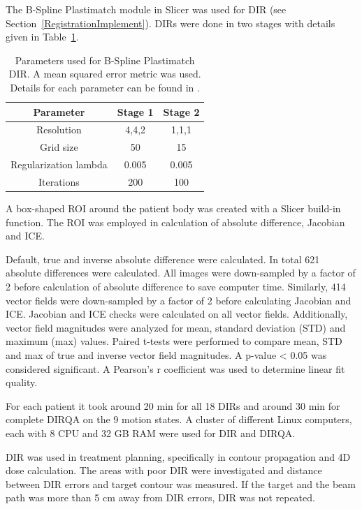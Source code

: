 The B-Spline Plastimatch module in Slicer was used for DIR (see Section~\ref{RegistrationImplement}). DIRs were done in two stages with details given in Table~\ref{tab:stages}. 

\begin{table}[H]
  \centering
  \caption{Parameters used for B-Spline Plastimatch DIR. A mean squared error metric was used. Details for each parameter can be found in \cite{Plastimatch}.}
  \begin{tabular}{|c|c|c|}
  \hline \hline
      Parameter & Stage 1 & Stage 2 \\
      \hline
      Resolution & 4,4,2 & 1,1,1 \\
      Grid size & 50 & 15 \\
      Regularization lambda & 0.005 & 0.005 \\
      Iterations & 200 & 100 \\
    \hline\hline
  \end{tabular}
  \label{tab:stages}
\end{table}


A box-shaped ROI around the patient body was created with a Slicer build-in function. The ROI was employed in calculation of absolute difference, Jacobian and ICE.

Default, true and inverse absolute difference were calculated. In total 621 absolute differences were calculated. All images were down-sampled by a factor of 2
before calculation of absolute difference to save computer time. Similarly, 414 vector fields were down-sampled by a factor of 2 before calculating Jacobian and ICE. Jacobian and ICE checks were calculated on all vector fields.
Additionally, vector field magnitudes were analyzed for mean, standard deviation (STD) and maximum (max) values. Paired t-tests were performed to compare mean, STD and max of true and inverse vector field magnitudes.
A p-value < 0.05 was considered significant. A Pearson's r coefficient was used to determine linear fit quality.


For each patient it took around 20 min for all 18 DIRs and around 30 min for complete DIRQA on the 9 motion states. A cluster of different Linux computers, each with 8 CPU and 32 GB RAM were used for DIR and DIRQA.

DIR was used in treatment planning, specifically in contour propagation and 4D dose calculation. The areas with poor DIR were investigated and distance between DIR errors 
and target contour was measured. If the target and the beam path was more than 5 cm away from DIR errors, DIR was not repeated.

